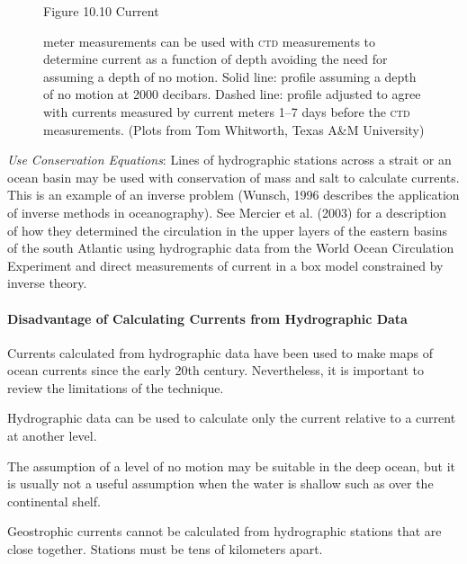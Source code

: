 \begin{enumerate}
\begin{figure}[t!]
\footnotesize
Figure 10.10 Current \rule{0mm}{3ex }meter measurements
can be used with \textsc{ctd} measurements to determine current as a function of
depth avoiding the need for assuming a depth of no motion. Solid line: profile
assuming a depth of no motion at 2000 decibars. Dashed line: profile
adjusted to agree with currents measured by current meters 1--7 days before the
\textsc{ctd} measurements.  (Plots from Tom Whitworth, Texas A\&M University)
\label{fig:whitplot}
\vspace{-3ex}
\end{figure}

\vitem \textit{Use Conservation Equations}: Lines of hydrographic stations across a strait or an ocean basin may be used with conservation
of mass and salt to calculate currents. This is an example of an inverse problem (Wunsch,
1996 describes the application of inverse methods in oceanography). See Mercier et al. (2003)
for a description of how they determined the circulation in the upper layers of the eastern
basins of the south Atlantic using hydrographic data from the World Ocean Circulation
Experiment and direct measurements of current in a box model constrained by inverse
theory.
\end{enumerate}

\paragraph{Disadvantage of Calculating Currents from Hydrographic Data}
Currents calculated from hydrographic
data have been used to make maps of ocean currents
since the early 20th century. Nevertheless, it is important to review
the limitations of the technique.

\begin{enumerate}
\vitem Hydrographic data can be used to
calculate only the current relative to a current at another level.

\vitem The assumption of a level of no motion may be suitable in the deep ocean,
but it is usually not a useful assumption when the water is shallow such
as over the continental shelf.

\vitem Geostrophic currents cannot be calculated from hydrographic stations that are close together. Stations must be tens of kilometers
apart.

\end{enumerate}

